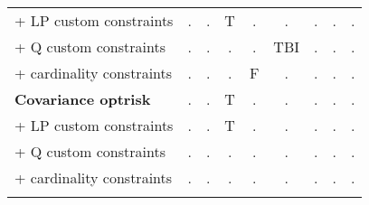 {{\begin{tabular*}{1\textwidth}{@{\extracolsep{\fill}}lcccccccc}
+  LP custom constraints & .     & .     & T     & .     & .     & .     & .     & . \\ \relax
+   Q custom constraints & .     & .     & .     & .     & TBI   & .     & .     & . \\ \relax
+ cardinality constraints & .     & .     & .     & F     & .     & .     & .     & . \\ \relax
\textbf{Covariance optrisk} & .     & .     & T     & .     & .     & .     & .     & . \\ \relax
+  LP custom constraints & .     & .     & T     & .     & .     & .     & .     & . \\ \relax
+   Q custom constraints & .     & .     & .     & .     & .     & .     & .     & . \\ \relax
+ cardinality constraints & .     & .     & .     & .     & .     & .     & .     & . \\ \relax
\end{tabular*}
\LL
}}
